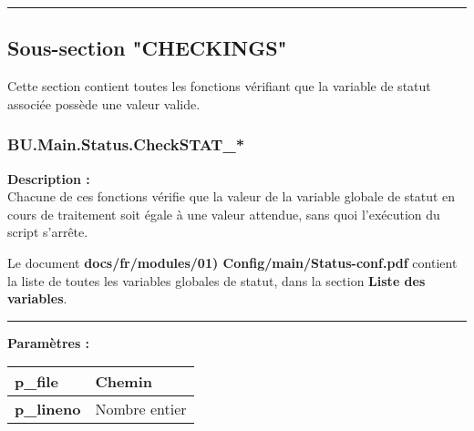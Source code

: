 \documentclass[a4paper,10pt]{article}
\begin{document}


    \color{sec2}\par\noindent\rule{\textwidth}{0.4pt}\color{text}

    \color{sec2}
    \subsection{Sous-section "CHECKINGS"}\color{text}

    \begin{justify}
        Cette section contient toutes les fonctions vérifiant que la variable de statut associée possède une valeur valide.
    \end{justify}

    \color{sec3}
    \subsubsection{BU.Main.Status.CheckSTAT\_*}\color{text}

    \begin{justify}
        \textbf{Description :}\\[1\baselineskip]
        Chacune de ces fonctions vérifie que la valeur de la variable globale de statut en cours de traitement soit égale à une valeur attendue, sans quoi l'exécution du script s'arrête.
    \end{justify}

    \begin{justify}
        Le document \textbf{\color{path}docs/fr/modules/01) Config/main/Status-conf.pdf} contient la liste de toutes les variables globales de statut, dans la section \textbf{\color{sec1}Liste des variables}.
    \end{justify}\setlength{\parskip}{1em}


    \par\noindent\rule{\textwidth}{0.4pt}

    \begin{justify}
        \textbf{Paramètres :}

        \begin{tabular}{|l|l|}
            \hline
            \textbf{\color{vars}p\_file} & Chemin\\
            \hline
            \textbf{\color{vars}p\_lineno} & Nombre entier\\
            \hline
        \end{tabular}
    \end{justify}
\end{document}
